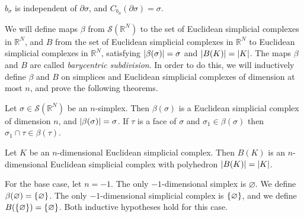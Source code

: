 \begin{lemma}
	\( b_\sigma \) is independent of \( \partial\sigma \), and \( C_{b_\sigma}(\partial \sigma) = \sigma \).
\end{lemma}
We will define maps \( \beta \) from \( \mathcal S(\mathbb R^N) \) to the set of Euclidean simplicial complexes in \( \mathbb R^N \), and \( B \) from the set of Euclidean simplicial complexes in \( \mathbb R^N \) to Euclidean simplicial complexes in \( \mathbb R^N \), satisfying \( \abs{\beta(\sigma)} = \sigma \) and \( \abs{B(K)} = \abs{K} \).
The maps \( \beta \) and \( B \) are called \emph{barycentric subdivision}.
In order to do this, we will inductively define \( \beta \) and \( B \) on simplices and Euclidean simplicial complexes of dimension at most \( n \), and prove the following theorems.
\begin{theorem}
	Let \( \sigma \in \mathcal S(\mathbb R^N) \) be an \( n \)-simplex.
	Then \( \beta(\sigma) \) is a Euclidean simplicial complex of dimension \( n \), and \( \abs{\beta(\sigma)} = \sigma \).
	If \( \tau \) is a face of \( \sigma \) and \( \sigma_1 \in \beta(\sigma) \) then \( \sigma_1 \cap \tau \in \beta(\tau) \).
\end{theorem}
\begin{theorem}
	Let \( K \) be an \( n \)-dimensional Euclidean simplicial complex.
	Then \( B(K) \) is an \( n \)-dimensional Euclidean simplicial complex with polyhedron \( \abs{B(K)} = \abs{K} \).
\end{theorem}
For the base case, let \( n = -1 \).
The only \( -1 \)-dimensional simplex is \( \varnothing \).
We define \( \beta(\varnothing) = \qty{\varnothing} \).
The only \( -1 \)-dimensional simplicial complex is \( \qty{\varnothing} \), and we define \( B(\qty{\varnothing}) = \qty{\varnothing} \).
Both inductive hypotheses hold for this case.

